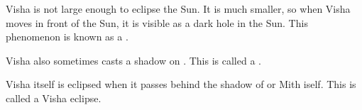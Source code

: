 Visha is not large enough to eclipse the Sun. It is much smaller, so when Visha moves in front of the Sun, it is visible as a dark hole in the Sun. This phenomenon is known as a . 

Visha also sometimes casts a shadow on \Dun{}. This is called a . 

Visha itself is eclipsed when it passes behind the shadow of \Dun{} or Mith iself. This is called a Visha eclipse. 



%

%




